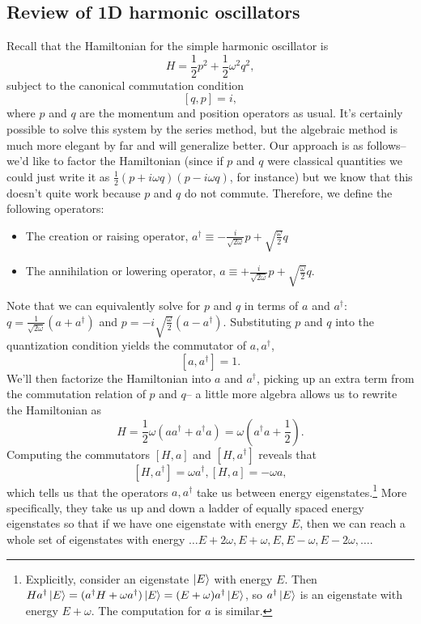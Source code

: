 \subsection*{Review of 1D harmonic oscillators} Recall that the Hamiltonian for the simple harmonic oscillator is
$$H=\frac{1}{2} p^2 +\frac{1}{2} \omega^2 q^2,$$
subject to the canonical commutation condition $$[q,p]=i,$$ 
where $p$ and $q$ are the momentum and position operators as usual. It's certainly possible to solve this system by the series method, but the algebraic method is much more elegant by far and will generalize better. Our approach is as follows-- we'd like to factor the Hamiltonian (since if $p$ and $q$ were classical quantities we could just write it as $\frac{1}{2}(p+i\omega q)(p-i\omega q)$, for instance) but we know that this doesn't quite work because $p$ and $q$ do not commute. Therefore, we define the following operators:
\begin{itemize}
\item The creation or raising operator, $a^\dagger \equiv -\frac{i}{\sqrt{2\omega}} p +\sqrt{\frac{\omega}{2}}q$
\item The annihilation or lowering operator, $a \equiv +\frac{i}{\sqrt{2\omega}} p +\sqrt{\frac{\omega}{2}}q$.
\end{itemize}
Note that we can equivalently solve for $p$ and $q$ in terms of $a$ and $a^\dagger$: $q=\frac{1}{\sqrt{2\omega}}(a+a^\dagger)$ and $p=-i \sqrt{\frac{\omega}{2}}(a-a^\dagger)$. Substituting $p$ and $q$ into the quantization condition yields the commutator of $a,a^\dagger$,
$$[a,a^\dagger]=1.$$
We'll then factorize the Hamiltonian into $a$ and $a^\dagger$, picking up an extra term from the commutation relation of $p$ and $q$-- a little more algebra allows us to rewrite the Hamiltonian as
$$H=\frac{1}{2}\omega (a a^\dagger+ a^\dagger a)=\omega \left(a^\dagger a +\frac{1}{2}\right).$$
Computing the commutators $[H,a]$ and $[H,a^\dagger]$ reveals that
$$[H,a^\dagger]=\omega a^\dagger, [H,a]=-\omega a,$$
which tells us that the operators $a,a^\dagger$ take us between energy eigenstates.\footnote{Explicitly, consider an eigenstate $\left| E \right>$ with energy $E$. Then $H a^\dagger \left| E \right>=(a^\dagger H +\omega a^\dagger)\left| E \right> =(E+\omega)a^\dagger \left| E \right>$, so $a^\dagger \left| E \right>$ is an eigenstate with energy $E+\omega.$ The computation for $a$ is similar.} More specifically, they take us up and down a ladder of equally spaced energy eigenstates so that if we have one eigenstate with energy $E$, then we can reach a whole set of eigenstates with energy $\ldots E+2\omega, E+\omega, E, E-\omega, E-2\omega, \ldots$.

